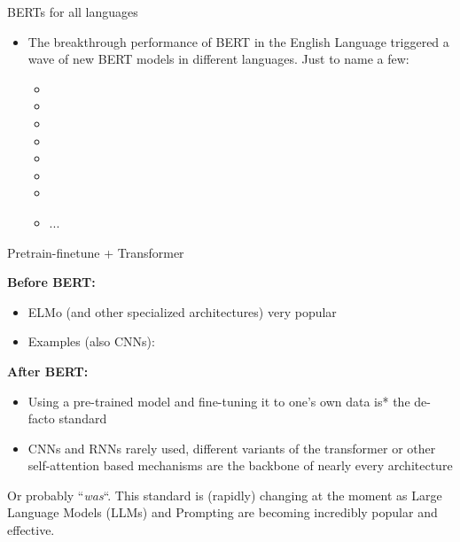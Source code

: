 \begin{frame}{BERTs for all languages}

\vfill

\begin{itemize}
	\item The breakthrough performance of BERT in the English Language triggered a wave of new
				BERT models in different languages. Just to name a few:
			\begin{itemize}
				\item {}
				\item {}
				\item {}
				\item {}
				\item {}
				\item {}
				\item {}
				\item ...
			\end{itemize}
\end{itemize}
	
\vfill

\end{frame}


\begin{frame}{Pretrain-finetune + Transformer}

\vfill

\textbf{Before BERT:} 
			\begin{itemize}
				\item ELMo (and other specialized architectures) very popular
				\item Examples (also CNNs): 
			\end{itemize}
\textbf{After BERT:}
			\begin{itemize}
				\item Using a pre-trained model and fine-tuning it to one's own data is* the de-facto standard
				\item CNNs and RNNs rarely used, different variants of the transformer or other self-attention based mechanisms are the backbone of nearly every architecture
			\end{itemize}

\vfill

{\scriptsize *Or probably ``\textit{was}``. This standard is (rapidly) changing at the moment as Large Language Models (LLMs) and Prompting are becoming incredibly popular and effective.}
\end{frame}

